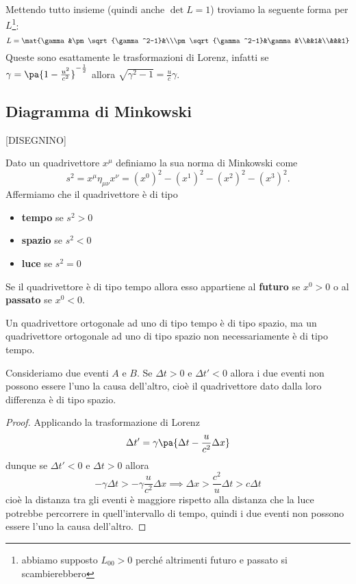 \noindent Mettendo tutto insieme (quindi anche $\det L=1$) troviamo la seguente forma per $L$\footnote{abbiamo supposto $L_{00}>0$ perch\'e altrimenti futuro e passato si scambierebbero}:
\[L=\mat{\gamma &\pm\sqrt{\gamma^2-1}&\\\pm\sqrt{\gamma^2-1}&\gamma&\\&&1&\\&&&1}\]
Queste sono esattamente le trasformazioni di Lorenz, infatti se $\gamma=\pa{1-\frac{u^2}{c^2}}^{-\frac12}$ allora $\sqrt{\gamma^2-1}=\frac uc\gamma$.

\subsection{Diagramma di Minkowski}
[DISEGNINO]
\begin{definition}
Dato un quadrivettore $x^\mu$ definiamo la sua norma di Minkowski come \[s^2=x^\mu \eta_{\mu\nu}x^\nu=(x^0)^2-(x^1)^2-(x^2)^2-(x^3)^2.\]
Affermiamo che il quadrivettore \`e di tipo 
\begin{itemize}
\item \textbf{tempo} se $s^2>0$
\item \textbf{spazio} se $s^2<0$
\item \textbf{luce} se $s^2=0$
\end{itemize}
Se il quadrivettore \`e di tipo tempo allora esso appartiene al \textbf{futuro} se $x^0>0$ o al \textbf{passato} se $x^0<0$.
\end{definition}

\begin{remark}
Un quadrivettore ortogonale ad uno di tipo tempo \`e di tipo spazio, ma un quadrivettore ortogonale ad uno di tipo spazio non necessariamente \`e di tipo tempo.
\end{remark}

\begin{proposition}
Consideriamo due eventi $A$ e $B$. Se $\Delta t>0$ e $\Delta t'<0$ allora i due eventi non possono essere l'uno la causa dell'altro, cio\`e il quadrivettore dato dalla loro differenza \`e di tipo spazio.
\end{proposition}
\begin{proof}
Applicando la trasformazione di Lorenz
\[\Delta t'=\gamma\pa{\Delta t-\frac u{c^2}\Delta x}\]
dunque se $\Delta t'<0$ e $\Delta t>0$ allora
\[-\gamma\Delta t>-\gamma\frac u{c^2}\Delta x\implies \Delta x>\frac{c^2}{u}\Delta t>c\Delta t\]
cio\`e la distanza tra gli eventi \`e maggiore rispetto alla distanza che la luce potrebbe percorrere in quell'intervallo di tempo, quindi i due eventi non possono essere l'uno la causa dell'altro.
\end{proof}

